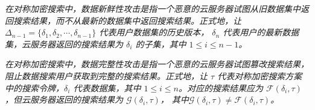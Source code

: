 \begin{definition}\label{def:freshness}
    {\itshape
			在对称加密搜索中，数据新鲜性攻击是指一个恶意的云服务器试图从旧数据集中返回搜索结果，而不从最新的数据集中返回搜索结果。正式地，让$\Delta_{n-1} = \{\delta_1,\delta_2,\cdots,\delta_{n-1}\}$ 代表用户数据集的历史版本， $\delta_n$ 代表用户的最新数据集，云服务器返回的搜索结果为 $\delta_i$ 的子集，其中 $1 \le i \le n-1$。
    }
\end{definition}

\begin{definition}\label{def:integrity}
    {\itshape
			在对称加密搜索中，数据完整性攻击是指一个恶意的云服务器试图篡改搜索结果，阻止数据搜索用户获取到完整的搜索结果。正式地，让 $\tau$ 代表对称加密搜索方案中的搜索令牌，$\delta_i$ 代表数据集，其中 $1 \le i \le n$。对应的搜索结果应为 $\mathcal{F}(\delta_i, \tau)$，但云服务器返回的搜索结果为 $\mathcal{G}(\delta_i, \tau)$， 其中$\mathcal{G}(\delta_i, \tau) \neq \mathcal{F}(\delta_i, \tau)$。
    }
\end{definition}


